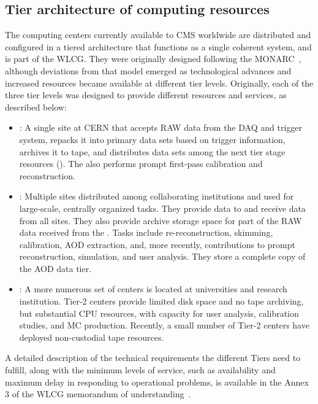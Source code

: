 \subsection{Tier architecture of computing resources}
\label{sec:tiers}

The computing centers currently available to CMS worldwide are distributed and configured in a tiered architecture that functions as a single coherent system, and is part of the \gls{WLCG}. They were originally designed following the \gls{MONARC}~\cite{Aderholz:2000nk}, although deviations from that model emerged as technological advances and increased resources became available at different tier levels. Originally, each of the three tier levels was designed to provide different resources and services, as described below: 

\begin{itemize}
\item \textbf{\TierZero}: A single site at CERN that accepts \gls{RAW} data from the \gls{DAQ} and trigger system, repacks it into primary data sets based on trigger information, archives it to tape, and distributes data sets among the next tier stage resources (\TierOne). The \TierZero also performs prompt first-pass calibration and reconstruction.
\item \textbf{\TierOne}: Multiple sites distributed among collaborating institutions and used for large-scale, centrally organized tasks. They provide data to and receive data from all \TierTwo sites. They also provide archive storage space for part of the \gls{RAW} data received from the \TierZero. Tasks include re-reconstruction, skimming, calibration, \gls{AOD} extraction, and, more recently, contributions to prompt reconstruction, simulation, and user analysis. They store a complete copy of the \gls{AOD} data tier.
\item \textbf{\TierTwo}: A more numerous set of centers is located at universities and research institution. Tier-2 centers provide limited disk space and no tape archiving, but substantial \gls{CPU} resources, with capacity for user analysis, calibration studies, and MC production. Recently, a small number of Tier-2 centers have deployed non-custodial tape resources.
\end{itemize}

A detailed description of the technical requirements the different Tiers need to fulfill, along with the minimum levels of service, such as availability and maximum delay in responding to operational problems, is available in the Annex 3 of the \gls{WLCG} memorandum of understanding~\cite{wlcg-mou-a3}.

